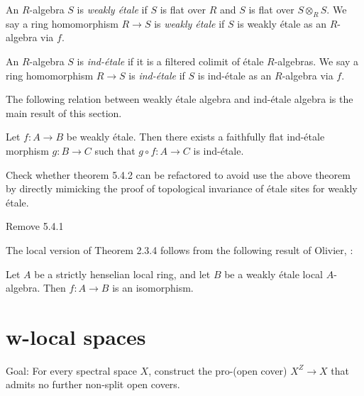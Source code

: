 \begin{definition}
    An $R$-algebra $S$ is \emph{weakly étale} if $S$ is flat over $R$ and
    $S$ is flat over $S \otimes_{R} S$. We say a ring homomorphism
    $R \to S$ is \emph{weakly étale} if $S$ is weakly étale as an $R$-algebra via $f$.
    \label{def:weakly-etale-algebra}
\end{definition}

\begin{definition}
    An $R$-algebra $S$ is \emph{ind-étale} if it is a filtered colimit of étale $R$-algebras.
    We say a ring homomorphism $R \to S$ is \emph{ind-étale} if $S$ is ind-étale as an $R$-algebra via $f$.
    \label{def:ind-etale-algebra}
\end{definition}

The following relation between weakly étale algebra and ind-étale algebra is the main result of this section.
\begin{theorem}
Let $f: A \to B$ be weakly étale. Then there exists a faithfully flat ind-étale morphism $g: B \to C$ such that $g \circ f: A \to C$ is ind-étale.
    \label{thm:weakly-etale-ind-etale}
\end{theorem}

Check whether theorem 5.4.2 can be refactored to avoid use the above theorem by directly mimicking the proof of topological invariance of étale sites for weakly étale.

Remove 5.4.1



The local version of Theorem 2.3.4 follows from the following result of Olivier, \cite{Oli72}:

\begin{theorem}
Let $A$ be a strictly henselian local ring, and let $B$ be a weakly étale local $A$-algebra. Then $f: A \to B$ is an isomorphism.
    \label{thm:weakly-etale-local}
\end{theorem}


\section{w-local spaces}

Goal: For every spectral space \(X\), construct the pro-(open cover) \(X^Z \to X\) that admits no further non-split open covers.

